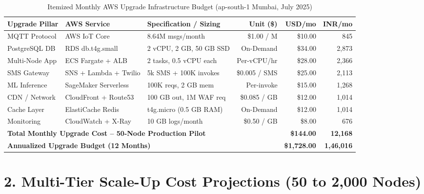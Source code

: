 \documentclass[10pt,a4paper]{article}
\begin{document}
\begin{table}[H]
\centering
\renewcommand{\arraystretch}{1.15}
\footnotesize
\begin{tabularx}{\linewidth}{l l X r r r}
\toprule
\textbf{Upgrade Pillar} & \textbf{AWS Service} & \textbf{Specification / Sizing} & \textbf{Unit (\$)} & \textbf{USD/mo} & \textbf{INR/mo} \\
\midrule
MQTT Protocol   & AWS IoT Core          & 8.64M msgs/month        & \$1.00 / M     & \$10.00  & 845 \\
PostgreSQL DB   & RDS db.t4g.small      & 2 vCPU, 2 GB, 50 GB SSD & On-Demand      & \$34.00  & 2,873 \\
Multi-Node App  & ECS Fargate + ALB     & 2 tasks, 0.5 vCPU each  & Per-vCPU/hr    & \$28.00  & 2,366 \\
SMS Gateway     & SNS + Lambda + Twilio & 5k SMS + 100K invokes   & \$0.005 / SMS  & \$25.00  & 2,113 \\
ML Inference    & SageMaker Serverless  & 100K reqs, 2 GB mem     & Per-invoke     & \$15.00  & 1,268 \\
CDN / Network   & CloudFront + Route53  & 100 GB out, 1M WAF req  & \$0.085 / GB   & \$12.00  & 1,014 \\
Cache Layer     & ElastiCache Redis     & t4g.micro (0.5 GB RAM)  & On-Demand      & \$12.00  & 1,014 \\
Monitoring      & CloudWatch + X-Ray    & 10 GB logs/month        & \$0.50 / GB    & \$8.00   & 676 \\
\midrule
\multicolumn{4}{l}{\textbf{Total Monthly Upgrade Cost -- 50-Node Production Pilot}} & \textbf{\$144.00} & \textbf{12,168} \\
\multicolumn{4}{l}{\textbf{Annualized Upgrade Budget (12 Months)}}                   & \textbf{\$1,728.00} & \textbf{1,46,016} \\
\bottomrule
\end{tabularx}
\caption{Itemized Monthly AWS Upgrade Infrastructure Budget (ap-south-1 Mumbai, July 2025)}
\label{tab:cost}
\end{table}

\vspace{4pt}
\section*{2. Multi-Tier Scale-Up Cost Projections (50 to 2,000 Nodes)}
\end{document}
